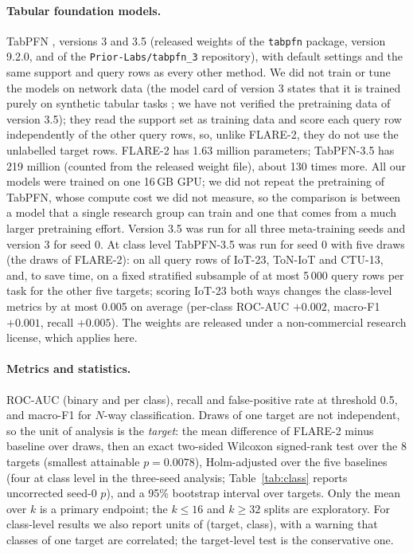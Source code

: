 \documentclass[11pt]{article}
\begin{document}
\paragraph{Tabular foundation models.}
TabPFN \citep[the family of][]{hollmann2025tabpfn}, versions 3 and 3.5 (released weights of the \texttt{tabpfn} package, version 9.2.0, and of the \texttt{Prior-Labs/tabpfn\_3} repository), with default settings and the same support and query rows as every other method.
We did not train or tune the models on network data (the model card of version 3 states that it is trained purely on synthetic tabular tasks \citep{priorlabs2026tabpfn3}; we have not verified the pretraining data of version 3.5); they read the support set as training data and score each query row independently of the other query rows, so, unlike FLARE-2, they do not use the unlabelled target rows. FLARE-2 has 1.63 million parameters; TabPFN-3.5 has 219 million (counted from the released weight file), about 130 times more. All our models were trained on one 16\,GB GPU; we did not repeat the pretraining of TabPFN, whose compute cost we did not measure, so the comparison is between a model that a single research group can train and one that comes from a much larger pretraining effort.
Version 3.5 was run for all three meta-training seeds and version 3 for seed 0.
At class level TabPFN-3.5 was run for seed 0 with five draws (the draws of FLARE-2): on all query rows of IoT-23, ToN-IoT and CTU-13, and, to save time, on a fixed stratified subsample of at most 5\,000 query rows per task for the other five targets; scoring IoT-23 both ways changes the class-level metrics by at most 0.005 on average (per-class ROC-AUC $+0.002$, macro-F1 $+0.001$, recall $+0.005$).
The weights are released under a non-commercial research license, which applies here.
\paragraph{Metrics and statistics.}
ROC-AUC (binary and per class), recall and false-positive rate at threshold 0.5, and macro-F1 for $N$-way classification.
Draws of one target are not independent, so the unit of analysis is the \emph{target}: the mean difference of FLARE-2 minus baseline over draws, then an exact two-sided Wilcoxon signed-rank test over the 8 targets (smallest attainable $p=0.0078$), Holm-adjusted over the five baselines (four at class level in the three-seed analysis; Table~\ref{tab:class} reports uncorrected seed-0 $p$), and a 95\% bootstrap interval over targets. Only the mean over $k$ is a primary endpoint; the $k\le16$ and $k\ge32$ splits are exploratory.
For class-level results we also report units of (target, class), with a warning that classes of one target are correlated; the target-level test is the conservative one.
\end{document}
